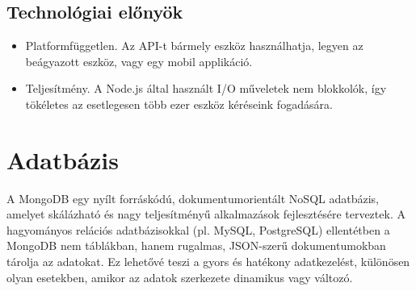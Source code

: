 \documentclass{thesis-ekf}
\theoremstyle{definition}
\theoremstyle{remark}
\begin{document}
	\subsection{Technológiai előnyök} 
		\begin{itemize}
			\item Platformfüggetlen. Az API-t bármely eszköz használhatja, legyen az beágyazott eszköz, vagy egy mobil applikáció.
			\item Teljesítmény. A Node.js által használt I/O műveletek nem blokkolók, így tökéletes az esetlegesen több ezer eszköz kéréseink fogadására.
		\end{itemize}
	
	
	\section{Adatbázis}
	A MongoDB egy nyílt forráskódú, dokumentumorientált NoSQL adatbázis, amelyet skálázható és nagy teljesítményű alkalmazások fejlesztésére terveztek. A hagyományos relációs adatbázisokkal (pl. MySQL, PostgreSQL) ellentétben a MongoDB nem táblákban, hanem rugalmas, JSON-szerű dokumentumokban tárolja az adatokat. Ez lehetővé teszi a gyors és hatékony adatkezelést, különösen olyan esetekben, amikor az adatok szerkezete dinamikus vagy változó.
	
\end{document}
